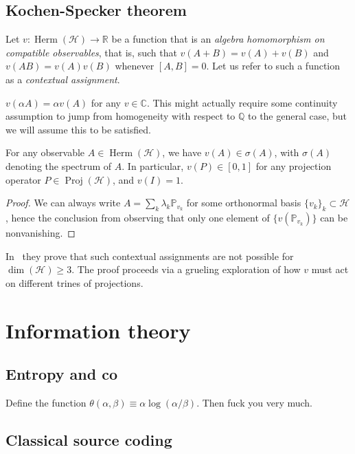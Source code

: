 \documentclass[12pt]{report}
\newcommand{\CC}{\mathbb{C}}
\newcommand{\PP}{\mathbb{P}}
\newcommand{\QQ}{\mathbb{Q}}
\newcommand{\RR}{\mathbb{R}}
\newcommand{\on}[1]{\operatorname{#1}}
\newcommand{\calH}{{\mathcal{H}}}
\DeclareMathOperator{\Herm}{Herm}
\begin{document}
\section{Kochen-Specker theorem}

\begin{defn}
	Let $v:\Herm(\calH)\to\RR$ be a function that is an \emph{algebra homomorphism on compatible observables}, that is, such that $v(A+B)=v(A)+v(B)$ and $v(AB)=v(A)v(B)$ whenever $[A,B]=0$.
	Let us refer to such a function as a \emph{contextual assignment}.
\end{defn}

\begin{prop}
	$v(\alpha A)=\alpha v(A)$ for any $v\in \CC$. This might actually require some continuity assumption to jump from homogeneity with respect to $\QQ$ to the general case, but we will assume this to be satisfied.
\end{prop}

\begin{prop}
	For any observable $A\in\Herm(\calH)$, we have $v(A)\in\sigma(A)$, with $\sigma(A)$ denoting the spectrum of $A$. In particular, $v(P)\in[0,1]$ for any projection operator $P\in\on{Proj}(\calH)$, and $v(I)=1$.
\end{prop}
\begin{proof}
	We can always write $A=\sum_k\lambda_k \PP_{v_k}$ for some orthonormal basis $\{v_k\}_k\subset\calH$, hence the conclusion from observing that only one element of $\{v(\PP_{v_k})\}$ can be nonvanishing.
\end{proof}

In~\parencite{cabello1994simple} they prove that such contextual assignments are not possible for $\on{dim}(\calH)\ge3$. The proof proceeds via a grueling exploration of how $v$ must act on different trines of projections.


\chapter{Information theory}



\section{Entropy and co}

Define the function $\theta(\alpha,\beta)\equiv \alpha\log(\alpha/\beta)$. Then fuck you very much.

\section{Classical source coding}
\end{document}
